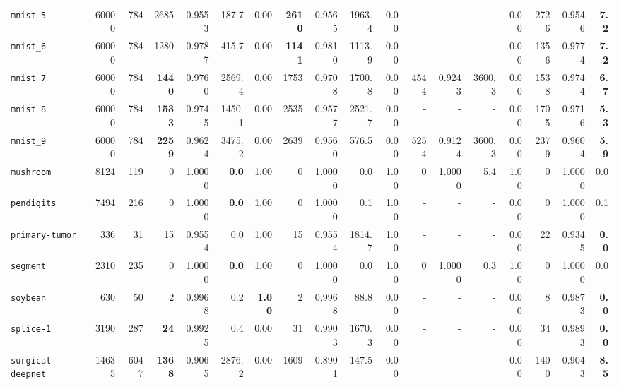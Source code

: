 \begin{tabular}{lccrrrrrrrrrrrrrrr}
\texttt{mnist\_5} & \multicolumn{1}{r}{60000} & \multicolumn{1}{r}{784}  & 2685 & 0.9553 & 187.7 & 0.00 & \textbf{2610} & 0.9565 & 1963.4 & 0.00 & - & - & - & 0.00 & 2726 & 0.9546 & \textbf{7.2}\\
\texttt{mnist\_6} & \multicolumn{1}{r}{60000} & \multicolumn{1}{r}{784}  & 1280 & 0.9787 & 415.7 & 0.00 & \textbf{1141} & 0.9810 & 1113.9 & 0.00 & - & - & - & 0.00 & 1356 & 0.9774 & \textbf{7.2}\\
\texttt{mnist\_7} & \multicolumn{1}{r}{60000} & \multicolumn{1}{r}{784}  & \textbf{1440} & 0.9760 & 2569.4 & 0.00 & 1753 & 0.9708 & 1700.8 & 0.00 & 4544 & 0.9243 & 3600.3 & 0.00 & 1538 & 0.9744 & \textbf{6.7}\\
\texttt{mnist\_8} & \multicolumn{1}{r}{60000} & \multicolumn{1}{r}{784}  & \textbf{1533} & 0.9745 & 1450.1 & 0.00 & 2535 & 0.9577 & 2521.7 & 0.00 & - & - & - & 0.00 & 1705 & 0.9716 & \textbf{5.3}\\
\texttt{mnist\_9} & \multicolumn{1}{r}{60000} & \multicolumn{1}{r}{784}  & \textbf{2259} & 0.9624 & 3475.2 & 0.00 & 2639 & 0.9560 & 576.5 & 0.00 & 5254 & 0.9124 & 3600.3 & 0.00 & 2379 & 0.9604 & \textbf{5.9}\\
\texttt{mushroom} & \multicolumn{1}{r}{8124} & \multicolumn{1}{r}{119}  & 0 & 1.0000 & \textbf{0.0} & 1.00 & 0 & 1.0000 & 0.0 & 1.00 & 0 & 1.0000 & 5.4 & 1.00 & 0 & 1.0000 & 0.0\\
\texttt{pendigits} & \multicolumn{1}{r}{7494} & \multicolumn{1}{r}{216}  & 0 & 1.0000 & \textbf{0.0} & 1.00 & 0 & 1.0000 & 0.1 & 1.00 & - & - & - & 0.00 & 0 & 1.0000 & 0.1\\
\texttt{primary-tumor} & \multicolumn{1}{r}{336} & \multicolumn{1}{r}{31}  & 15 & 0.9554 & 0.0 & 1.00 & 15 & 0.9554 & 1814.7 & 1.00 & - & - & - & 0.00 & 22 & 0.9345 & \textbf{0.0}\\
\texttt{segment} & \multicolumn{1}{r}{2310} & \multicolumn{1}{r}{235}  & 0 & 1.0000 & \textbf{0.0} & 1.00 & 0 & 1.0000 & 0.0 & 1.00 & 0 & 1.0000 & 0.3 & 1.00 & 0 & 1.0000 & 0.0\\
\texttt{soybean} & \multicolumn{1}{r}{630} & \multicolumn{1}{r}{50}  & 2 & 0.9968 & 0.2 & \textbf{1.00} & 2 & 0.9968 & 88.8 & 0.00 & - & - & - & 0.00 & 8 & 0.9873 & \textbf{0.0}\\
\texttt{splice-1} & \multicolumn{1}{r}{3190} & \multicolumn{1}{r}{287}  & \textbf{24} & 0.9925 & 0.4 & 0.00 & 31 & 0.9903 & 1670.3 & 0.00 & - & - & - & 0.00 & 34 & 0.9893 & \textbf{0.0}\\
\texttt{surgical-deepnet} & \multicolumn{1}{r}{14635} & \multicolumn{1}{r}{6047}  & \textbf{1368} & 0.9065 & 2876.2 & 0.00 & 1609 & 0.8901 & 147.5 & 0.00 & - & - & - & 0.00 & 1400 & 0.9043 & \textbf{8.5}\\

\end{tabular}
